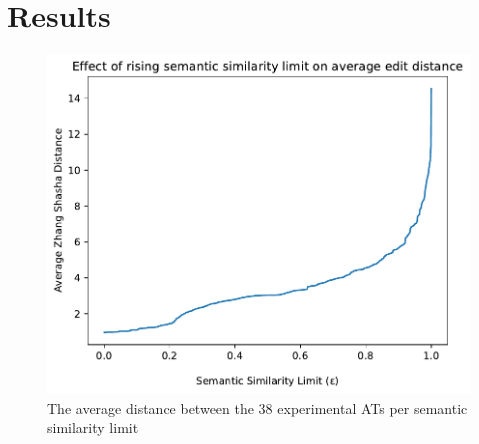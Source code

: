 \section{Results}
\label{sec:results}

\begin{figure}
    \includegraphics[width=\linewidth]{code/img/similaritylimits.pdf}
\caption{The average distance between the 38 experimental ATs per semantic similarity limit}
\label{img:similaritylimits}
\end{figure}
